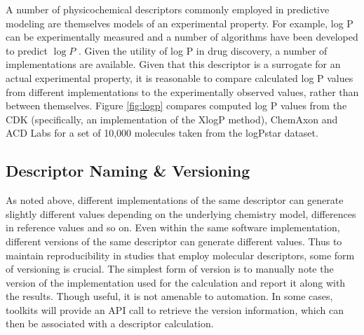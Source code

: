 \documentclass[letterpaper, 12pt]{article}
\begin{document}
A number of physicochemical descriptors commonly employed in
predictive modeling are themselves models of an experimental
property. For example, log P can be experimentally measured and a
number of algorithms have been developed to predict $\log P$
\cite{Wang:1997aa,Wildman:1999aa}. Given the utility of log P in drug
discovery, a number of implementations are available. Given that this
descriptor is a surrogate for an actual experimental property, it is
reasonable to compare calculated log P values from different
implementations to the experimentally observed values, rather than
between themselves. Figure \ref{fig:logp} compares computed log P
values from the CDK (specifically, an implementation of the XlogP
method), ChemAxon and ACD Labs for a set of 10,000 molecules taken
from the logPstar dataset.

\subsection{Descriptor Naming \& Versioning}
\label{sec:descr-vers}

As noted above, different implementations of the same descriptor can
generate slightly different values depending on the underlying
chemistry model, differences in reference values and so on. Even
within the same software implementation, different versions of the
same descriptor can generate different values. Thus to maintain
reproducibility in studies that employ molecular descriptors, some
form of versioning is crucial. The simplest form of version is to
manually note the version of the implementation used for the
calculation and report it along with the results. Though useful, it is
not amenable to automation. In some cases, toolkits will provide an
API call to retrieve the version information, which can then be
associated with a descriptor calculation.
\end{document}
